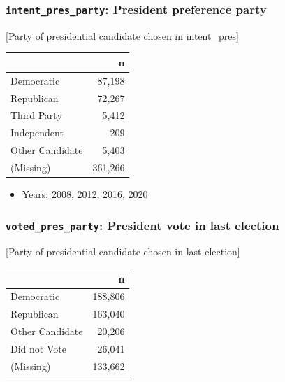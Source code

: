 \documentclass[10pt,article,oneside]{memoir}
\theoremstyle{definition}
\begin{document}
\hypertarget{intent_pres_party-president-preference-party}{%
\subsubsection{\texorpdfstring{\texttt{intent\_pres\_party}: President
preference
party}{intent\_pres\_party: President preference party}}\label{intent_pres_party-president-preference-party}}

{[}Party of presidential candidate chosen in intent\_pres{]}

\begin{table}[H]
\centering
\begin{tabular}{lr}
\toprule
 & n\\
\midrule
Democratic & 87,198\\
Republican & 72,267\\
Third Party & 5,412\\
Independent & 209\\
Other Candidate & 5,403\\
(Missing) & 361,266\\
\bottomrule
\end{tabular}
\end{table}

\begin{itemize}
\tightlist
\item
  Years: 2008, 2012, 2016, 2020
\end{itemize}

\hypertarget{voted_pres_party-president-vote-in-last-election}{%
\subsubsection{\texorpdfstring{\texttt{voted\_pres\_party}: President
vote in last
election}{voted\_pres\_party: President vote in last election}}\label{voted_pres_party-president-vote-in-last-election}}

{[}Party of presidential candidate chosen in last election{]}

\begin{table}[H]
\centering
\begin{tabular}{lr}
\toprule
 & n\\
\midrule
Democratic & 188,806\\
Republican & 163,040\\
Other Candidate & 20,206\\
Did not Vote & 26,041\\
(Missing) & 133,662\\
\bottomrule
\end{tabular}
\end{table}
\end{document}
